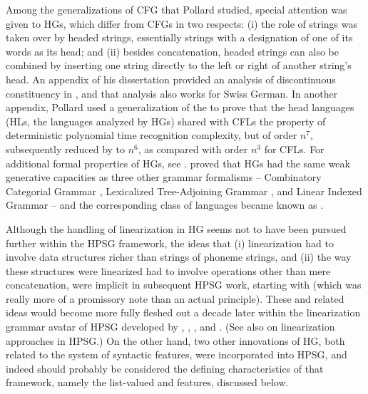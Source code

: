 \documentclass[output=paper,biblatex,babelshorthands,newtxmath,draftmode,colorlinks,citecolor=brown]{langscibook}
\begin{document}
\enlargethispage{5pt}
Among the generalizations of CFG that Pollard studied, special attention was given to HGs, which
differ from CFGs in two respects: (i) the role of strings was taken over by headed strings,
essentially strings with a designation of one of its words as its head; and (ii) besides
concatenation, headed strings can also be combined by inserting one string directly to the left or
right of another string's head. An appendix of his dissertation \citep[Appendix~1]{Pollard84a-u}
provided an analysis of discontinuous constituency in , and that analysis also works for
Swiss German. In another appendix, Pollard used a generalization of the  to prove that the head languages (HLs, the languages analyzed by HGs) shared with CFLs
the property of deterministic polynomial time recognition complexity, but of order $n^{7}$,
subsequently reduced by \citet*{Kasamietal1989} to $n^{6}$, as compared with order $n^{3}$ for
CFLs. For additional formal properties of HGs, see \citet{Roach1987}. \citet{VijayWeir1994} proved
that HGs had the same weak generative capacities as three other grammar formalisms -- Combinatory
Categorial Grammar \citep{Steedman87a-u,Steedman90a-u}, Lexicalized Tree-Adjoining Grammar
\citep{Shabes90}, and Linear Indexed Grammar \citep{Gazdar88a-u} -- and the corresponding class of
languages became known as \emph{}.

Although the handling of linearization in HG seems not to have been pursued further within the HPSG
framework, the ideas that (i) linearization had to involve data structures richer than strings of
phoneme strings, and (ii) the way these structures were linearized had to involve operations other
than mere concatenation, were implicit in subsequent HPSG work, starting with   (which was really more of a promissory note than an
actual principle).  These and related ideas would become more fully fleshed out a decade later
within the linearization grammar avatar of HPSG developed by \citet{Reape90a},
\citet{Reape92a}, \citet{Kathol95a,Kathol2000a}, and
\citet{Mueller95c,Babel,Mueller99a,Mueller2004b}. (See also
 on linearization approaches in HPSG.) On the
other hand, two other innovations of HG, both related to the system of syntactic features, were
incorporated into HPSG, and indeed should probably be considered the defining characteristics of
that framework, namely the list-valued \subcat and \slasch features, discussed below.
\end{document}
